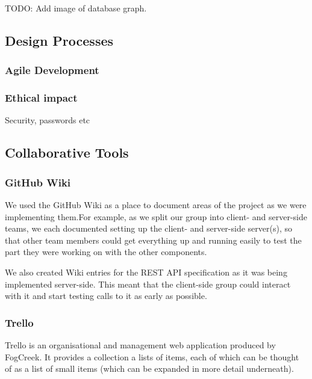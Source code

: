 \documentclass[11pt]{article}
\let\footnote=\endnote
\begin{document}
{TODO: Add image of database graph.
\subsection {Design Processes}

\subsubsection {Agile Development}
\subsubsection {Ethical impact}
	Security, passwords etc

\subsection {Collaborative Tools}
\subsubsection {GitHub Wiki}
We used the GitHub Wiki as a place to document areas of the project as we were implementing them.For example, as we split our group into client- and server-side teams, we each documented setting up the client- and server-side server(s), so that other team members could get everything up and running easily to test the part they were working on with the other components.

We also created Wiki entries for the REST API specification as it was being implemented server-side. This meant that the client-side group could interact with it and start testing calls to it as early as possible.
\subsubsection {Trello}

Trello\footnote{\url{http://trello.com}} is an organisational and management web application produced by FogCreek. It provides a collection a lists of items, each of which can be thought of as a list of small items (which can be expanded in more detail underneath).

}
\end{document}
